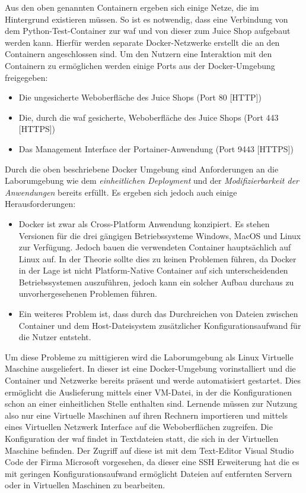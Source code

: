 Aus den oben genannten Containern ergeben sich einige Netze, die im Hintergrund existieren müssen.
So ist es notwendig, dass eine Verbindung von dem Python-Test-Container zur \ac{waf} und von dieser zum Juice Shop aufgebaut werden kann.
Hierfür werden separate Docker-Netzwerke erstellt die an den Containern angeschlossen sind.
Um den Nutzern eine Interaktion mit den Containern zu ermöglichen werden einige Ports aus der Docker-Umgebung freigegeben:

\begin{itemize}
    \item Die ungesicherte Weboberfläche des Juice Shops (Port 80 [HTTP])
    \item Die, durch die \ac{waf} gesicherte, Weboberfläche des Juice Shops (Port 443 [HTTPS])
    \item Das Management Interface der Portainer-Anwendung (Port 9443 [HTTPS])
\end{itemize}

Durch die oben beschriebene Docker Umgebung sind Anforderungen an die Laborumgebung wie dem \textit{einheitlichen Deployment} und der \textit{Modifizierbarkeit der Anwendungen} bereits erfüllt.
Es ergeben sich jedoch auch einige Herausforderungen:

\begin{itemize}
    \item Docker ist zwar als Cross-Platform Anwendung konzipiert.
    Es stehen Versionen für die drei gängigen Betriebssysteme Windows, MacOS und Linux zur Verfügung.
    Jedoch bauen die verwendeten Container hauptsächlich auf Linux auf.
    In der Theorie sollte dies zu keinen Problemen führen, da Docker in der Lage ist nicht Platform-Native Container auf sich unterscheidenden Betriebssystemen auszuführen, jedoch kann ein solcher Aufbau durchaus zu unvorhergesehenen Problemen führen.
    \item Ein weiteres Problem ist, dass durch das Durchreichen von Dateien zwischen Container und dem Host-Dateisystem zusätzlicher Konfigurationsaufwand für die Nutzer entsteht.
\end{itemize}

Um diese Probleme zu mittigieren wird die Laborumgebung als Linux Virtuelle Maschine ausgeliefert.
In dieser ist eine Docker-Umgebung vorinstalliert und die Container und Netzwerke bereits präsent und werde automatisiert gestartet.
Dies ermöglicht die Auslieferung mittels einer VM-Datei, in der die Konfigurationen schon an einer einheitlichen Stelle enthalten sind.
Lernende müssen zur Nutzung also nur eine Virtuelle Maschinen auf ihren Rechnern importieren und mittels eines Virtuellen Netzwerk Interface auf die Weboberflächen zugreifen.
Die Konfiguration der \ac{waf} findet in Textdateien statt, die sich in der Virtuellen Maschine befinden.
Der Zugriff auf diese ist mit dem Text-Editor Visual Studio Code der Firma Microsoft vorgesehen, da dieser eine SSH Erweiterung hat die es mit geringen Konfigurationsaufwand ermöglicht Dateien auf entfernten Servern oder in Virtuellen Maschinen zu bearbeiten.

